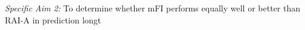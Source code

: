 \emph{Specific Aim 2:} To determine whether mFI performs equally well or better than RAI-A in prediction longt